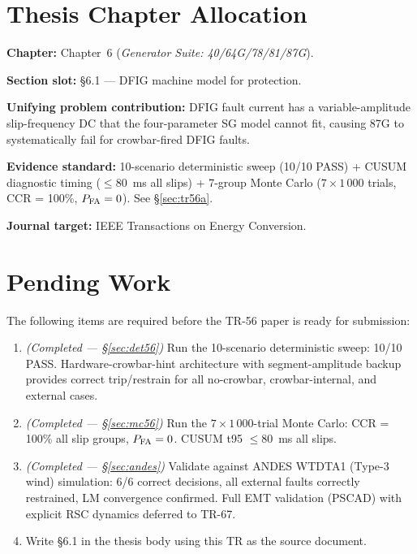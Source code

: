 \documentclass[11pt,a4paper]{article}
\begin{document}
\section{Thesis Chapter Allocation}
\label{sec:thesis}

\textbf{Chapter:} Chapter~6 (\textit{Generator Suite: 40/64G/78/81/87G}).

\textbf{Section slot:} \S6.1 — DFIG machine model for protection.

\textbf{Unifying problem contribution:} DFIG fault current has a
variable-amplitude slip-frequency DC that the four-parameter SG model cannot
fit, causing 87G to systematically fail for crowbar-fired DFIG faults.

\textbf{Evidence standard:} 10-scenario deterministic sweep (10/10 PASS) +
CUSUM diagnostic timing ($\leq 80$~ms all slips) + 7-group Monte Carlo
($7 \times 1\,000$ trials, CCR = 100\%, $P_{\rm FA} = 0$).
See §\ref{sec:tr56a}.

\textbf{Journal target:} IEEE Transactions on Energy Conversion.

\section{Pending Work}
\label{sec:pending}

The following items are required before the TR-56 paper is ready for
submission:

\begin{enumerate}
  \item[\checkmark] \textit{(Completed — §\ref{sec:det56})} Run the
        10-scenario deterministic sweep: 10/10 PASS.  Hardware-crowbar-hint
        architecture with segment-amplitude backup provides correct
        trip/restrain for all no-crowbar, crowbar-internal, and external cases.
  \item[\checkmark] \textit{(Completed — §\ref{sec:mc56})} Run the
        $7 \times 1\,000$-trial Monte Carlo: CCR = 100\% all slip groups,
        $P_{\rm FA} = 0$.  CUSUM t95 $\leq 80$~ms all slips.
  \item[\checkmark] \textit{(Completed — §\ref{sec:andes})} Validate against
        ANDES WTDTA1 (Type-3 wind) simulation: 6/6 correct decisions, all
        external faults correctly restrained, LM convergence confirmed.
        Full EMT validation (PSCAD) with explicit RSC dynamics deferred to TR-67.
  \item Write \S6.1 in the thesis body using this TR as the source document.
\end{enumerate}
\end{document}
